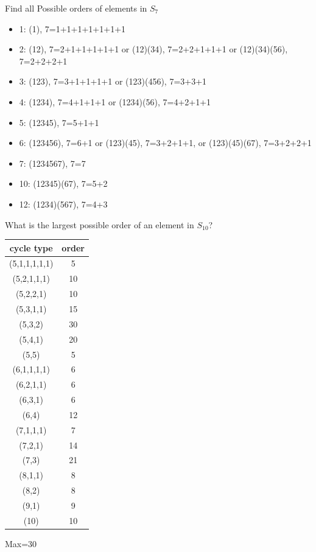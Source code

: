 \begin{example}
    Find all Possible orders of elements in \(S_7\)
    \begin{itemize}
        \item 1: (1), 7=1+1+1+1+1+1+1
        \item 2: (12), 7=2+1+1+1+1+1 or (12)(34), 7=2+2+1+1+1 or (12)(34)(56), 7=2+2+2+1 
        \item 3: (123), 7=3+1+1+1+1 or (123)(456), 7=3+3+1
        \item 4: (1234), 7=4+1+1+1 or (1234)(56), 7=4+2+1+1
        \item 5: (12345), 7=5+1+1
        \item 6: (123456), 7=6+1 or (123)(45), 7=3+2+1+1, or (123)(45)(67), 7=3+2+2+1
        \item 7: (1234567), 7=7
        \item 10: (12345)(67), 7=5+2
        \item 12: (1234)(567), 7=4+3
    \end{itemize}
\end{example}
\newpage
\begin{example}
    What is the largest possible order of an element in \(S_{10}\)?
    \begin{table}[h!]
        \centering
        \begin{tabular}{|c|c|}
            \hline
            \textbf{cycle type} & \textbf{order} \\
            \hline
            (5,1,1,1,1,1) & 5 \\
            (5,2,1,1,1) & 10 \\
            (5,2,2,1) & 10 \\
            (5,3,1,1) & 15 \\
            (5,3,2) & 30 \\
            (5,4,1) & 20 \\
            (5,5) & 5 \\
            (6,1,1,1,1) & 6 \\
            (6,2,1,1) & 6 \\
            (6,3,1) & 6 \\
            (6,4) & 12 \\
            (7,1,1,1) & 7 \\
            (7,2,1) & 14 \\
            (7,3) & 21 \\
            (8,1,1) & 8 \\
            (8,2) & 8 \\
            (9,1) & 9 \\
            (10) & 10 \\
            \hline
        \end{tabular}
    \end{table}

    Max=30
\end{example}
